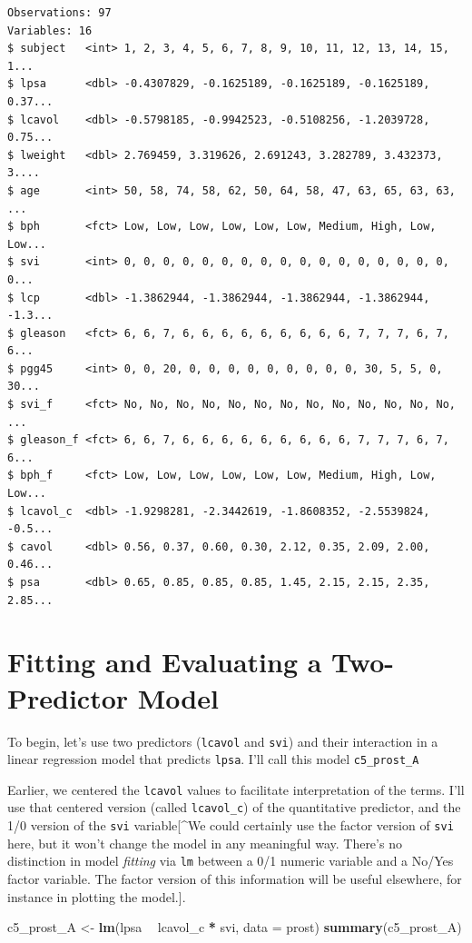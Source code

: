\documentclass[]{book}
\newenvironment{Shaded}{\begin{snugshade}}{\end{snugshade}}
\newcommand{\KeywordTok}[1]{\textcolor[rgb]{0.13,0.29,0.53}{\textbf{#1}}}
\newcommand{\DataTypeTok}[1]{\textcolor[rgb]{0.13,0.29,0.53}{#1}}
\newcommand{\StringTok}[1]{\textcolor[rgb]{0.31,0.60,0.02}{#1}}
\newcommand{\OperatorTok}[1]{\textcolor[rgb]{0.81,0.36,0.00}{\textbf{#1}}}
\newcommand{\NormalTok}[1]{#1}
\theoremstyle{definition}
\theoremstyle{definition}
\theoremstyle{definition}
\theoremstyle{remark}
\begin{document}
\begin{verbatim}
Observations: 97
Variables: 16
$ subject   <int> 1, 2, 3, 4, 5, 6, 7, 8, 9, 10, 11, 12, 13, 14, 15, 1...
$ lpsa      <dbl> -0.4307829, -0.1625189, -0.1625189, -0.1625189, 0.37...
$ lcavol    <dbl> -0.5798185, -0.9942523, -0.5108256, -1.2039728, 0.75...
$ lweight   <dbl> 2.769459, 3.319626, 2.691243, 3.282789, 3.432373, 3....
$ age       <int> 50, 58, 74, 58, 62, 50, 64, 58, 47, 63, 65, 63, 63, ...
$ bph       <fct> Low, Low, Low, Low, Low, Low, Medium, High, Low, Low...
$ svi       <int> 0, 0, 0, 0, 0, 0, 0, 0, 0, 0, 0, 0, 0, 0, 0, 0, 0, 0...
$ lcp       <dbl> -1.3862944, -1.3862944, -1.3862944, -1.3862944, -1.3...
$ gleason   <fct> 6, 6, 7, 6, 6, 6, 6, 6, 6, 6, 6, 6, 7, 7, 7, 6, 7, 6...
$ pgg45     <int> 0, 0, 20, 0, 0, 0, 0, 0, 0, 0, 0, 0, 30, 5, 5, 0, 30...
$ svi_f     <fct> No, No, No, No, No, No, No, No, No, No, No, No, No, ...
$ gleason_f <fct> 6, 6, 7, 6, 6, 6, 6, 6, 6, 6, 6, 6, 7, 7, 7, 6, 7, 6...
$ bph_f     <fct> Low, Low, Low, Low, Low, Low, Medium, High, Low, Low...
$ lcavol_c  <dbl> -1.9298281, -2.3442619, -1.8608352, -2.5539824, -0.5...
$ cavol     <dbl> 0.56, 0.37, 0.60, 0.30, 2.12, 0.35, 2.09, 2.00, 0.46...
$ psa       <dbl> 0.65, 0.85, 0.85, 0.85, 1.45, 2.15, 2.15, 2.35, 2.85...
\end{verbatim}

\section{Fitting and Evaluating a Two-Predictor
Model}\label{fitting-and-evaluating-a-two-predictor-model}

To begin, let's use two predictors (\texttt{lcavol} and \texttt{svi})
and their interaction in a linear regression model that predicts
\texttt{lpsa}. I'll call this model \texttt{c5\_prost\_A}

Earlier, we centered the \texttt{lcavol} values to facilitate
interpretation of the terms. I'll use that centered version (called
\texttt{lcavol\_c}) of the quantitative predictor, and the 1/0 version
of the \texttt{svi} variable{[}\^{}We could certainly use the factor
version of \texttt{svi} here, but it won't change the model in any
meaningful way. There's no distinction in model \emph{fitting} via
\texttt{lm} between a 0/1 numeric variable and a No/Yes factor variable.
The factor version of this information will be useful elsewhere, for
instance in plotting the model.{]}.

\begin{Shaded}
\begin{Highlighting}[]
\NormalTok{c5_prost_A <-}\StringTok{ }\KeywordTok{lm}\NormalTok{(lpsa }\OperatorTok{~}\StringTok{ }\NormalTok{lcavol_c }\OperatorTok{*}\StringTok{ }\NormalTok{svi, }\DataTypeTok{data =}\NormalTok{ prost)}
\KeywordTok{summary}\NormalTok{(c5_prost_A)}
\end{Highlighting}
\end{Shaded}
\end{document}
